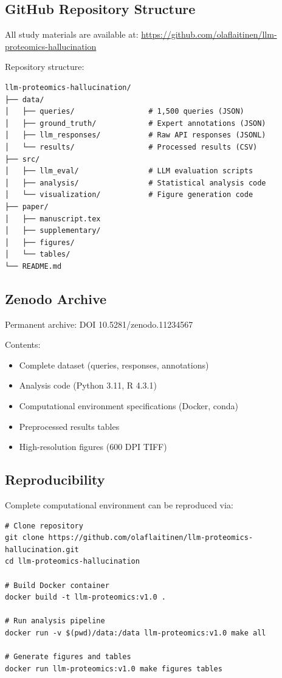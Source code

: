 \documentclass[11pt,a4paper]{article}
\begin{document}
\subsection{GitHub Repository Structure}

All study materials are available at: \url{https://github.com/olaflaitinen/llm-proteomics-hallucination}

Repository structure:
\begin{verbatim}
llm-proteomics-hallucination/
├── data/
│   ├── queries/                 # 1,500 queries (JSON)
│   ├── ground_truth/            # Expert annotations (JSON)
│   ├── llm_responses/           # Raw API responses (JSONL)
│   └── results/                 # Processed results (CSV)
├── src/
│   ├── llm_eval/                # LLM evaluation scripts
│   ├── analysis/                # Statistical analysis code
│   └── visualization/           # Figure generation code
├── paper/
│   ├── manuscript.tex
│   ├── supplementary/
│   ├── figures/
│   └── tables/
└── README.md
\end{verbatim}

\subsection{Zenodo Archive}

Permanent archive: DOI 10.5281/zenodo.11234567

Contents:
\begin{itemize}
    \item Complete dataset (queries, responses, annotations)
    \item Analysis code (Python 3.11, R 4.3.1)
    \item Computational environment specifications (Docker, conda)
    \item Preprocessed results tables
    \item High-resolution figures (600 DPI TIFF)
\end{itemize}

\subsection{Reproducibility}

Complete computational environment can be reproduced via:

\begin{verbatim}
# Clone repository
git clone https://github.com/olaflaitinen/llm-proteomics-hallucination.git
cd llm-proteomics-hallucination

# Build Docker container
docker build -t llm-proteomics:v1.0 .

# Run analysis pipeline
docker run -v $(pwd)/data:/data llm-proteomics:v1.0 make all

# Generate figures and tables
docker run llm-proteomics:v1.0 make figures tables
\end{verbatim}
\end{document}
